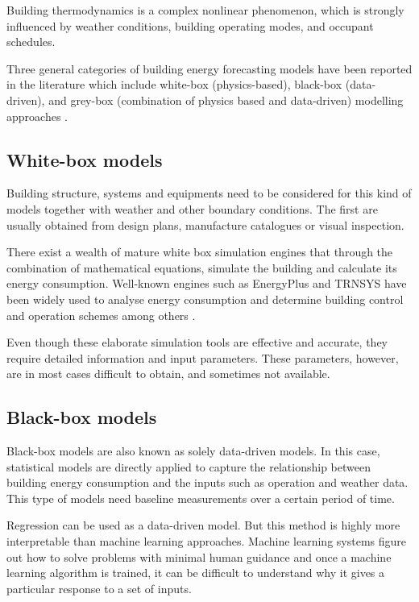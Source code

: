 \documentclass[10pt, conference, compsocconf]{IEEEtran}
\begin{document}
Building thermodynamics is a complex nonlinear phenomenon, which is strongly influenced by weather conditions, building operating modes, and occupant schedules.

Three general categories of building energy forecasting models have been reported in the literature which include white-box (physics-based), black-box (data-driven), and grey-box (combination of physics based and data-driven) modelling approaches \cite{li2014review}.

\subsection{White-box models}


Building structure, systems and equipments need to be considered for this kind of models together with weather and other boundary conditions. The first are usually obtained from design plans, manufacture catalogues or visual inspection.

There exist a wealth of mature white box simulation engines that through the combination of mathematical equations, simulate the building and calculate its energy consumption. Well-known engines such as EnergyPlus \cite{crawley2001energyplus} and TRNSYS \cite{TRNSYS} have been widely used to analyse energy consumption and determine building control and operation schemes among others \cite{crawley2008contrasting}.

Even though these elaborate simulation tools are effective and accurate, they require detailed information and input parameters. These parameters, however, are in most cases difficult to obtain, and sometimes not available.

\subsection{Black-box models}


Black-box models are also known as solely data-driven models. In this case, statistical models are directly applied to capture the relationship between building energy consumption and the inputs such as operation and weather data. This type of models need baseline measurements over a certain period of time.

Regression can be used as a data-driven model. But this method is highly more interpretable than machine learning approaches. 
Machine learning systems figure out how to solve problems with minimal human guidance and once a machine learning algorithm is trained, it can be difficult to understand why it gives a particular response to a set of inputs. 
\end{document}
